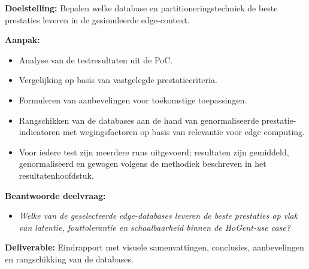 \textbf{Doelstelling:}  
Bepalen welke database en partitioneringstechniek de beste prestaties leveren in de gesimuleerde edge-context.

\textbf{Aanpak:}
\begin{itemize}
    \item Analyse van de testresultaten uit de PoC.
    \item Vergelijking op basis van vastgelegde prestatiecriteria.
    \item Formuleren van aanbevelingen voor toekomstige toepassingen.
    \item Rangschikken van de databases aan de hand van genormaliseerde prestatie-indicatoren met wegingsfactoren op basis van relevantie voor edge computing.
    \item Voor iedere test zijn meerdere runs uitgevoerd; resultaten zijn gemiddeld, genormaliseerd en gewogen volgens de methodiek beschreven in het resultatenhoofdstuk.
\end{itemize}

\textbf{Beantwoorde deelvraag:}
\begin{itemize}
    \item \emph{Welke van de geselecteerde edge-databases leveren de beste prestaties op vlak van latentie, fouttolerantie en schaalbaarheid binnen de HoGent-use case?}
\end{itemize}

\textbf{Deliverable:} Eindrapport met visuele samenvattingen, conclusies, aanbevelingen en rangschikking van de databases.\\